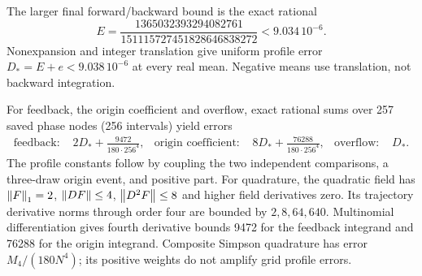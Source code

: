 The larger final forward/backward bound is the exact rational
\[
 E=\frac{1365032393294082761}{151115727451828646838272}
 <9.034\,10^{-6}.
\]
Nonexpansion and integer translation give uniform profile error $D_*=E+e<9.038\,10^{-6}$ at every real mean. Negative means use translation, not backward integration.

For feedback, the origin coefficient and overflow, exact rational sums over 257 saved phase nodes (256 intervals) yield errors
\begin{align*}
 \text{feedback: }&2D_*+\frac{9472}{180\cdot256^4},&
 \text{origin coefficient: }&8D_*+\frac{76288}{180\cdot256^4},&
 \text{overflow: }&D_*.
\end{align*}
The profile constants follow by coupling the two independent comparisons, a three-draw origin event, and positive part. For quadrature, the quadratic field has $\left\lVert F\right\rVert_1=2$, $\left\lVert DF\right\rVert\le4$, $\left\lVert D^2F\right\rVert\le8$ and higher field derivatives zero. Its trajectory derivative norms through order four are bounded by $2,8,64,640$. Multinomial differentiation gives fourth derivative bounds 9472 for the feedback integrand and 76288 for the origin integrand. Composite Simpson quadrature has error $M_4/(180N^4)$; its positive weights do not amplify grid profile errors.
